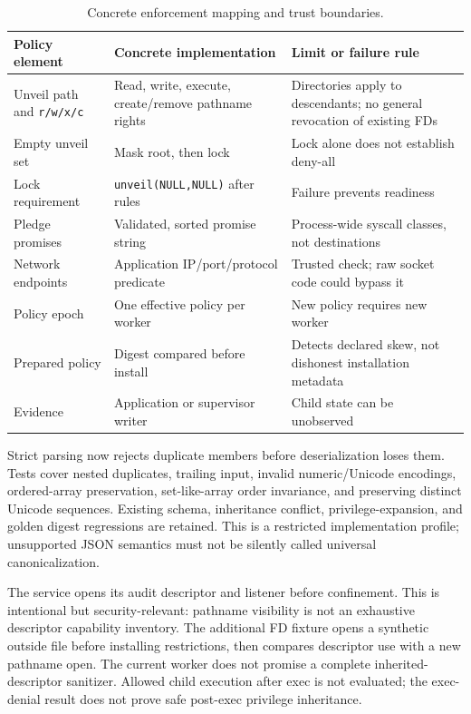 \documentclass[electronics,article,submit,pdftex,moreauthors]{Definitions/mdpi}
\begin{document}
\begin{table}[H]\caption{Concrete enforcement mapping and trust boundaries.}\label{tab:mapping}
\begin{tabularx}{\textwidth}{lYY}
\toprule Policy element & Concrete implementation & Limit or failure rule\\\midrule
Unveil path and \texttt{r/w/x/c} & Read, write, execute, create/remove pathname rights & Directories apply to descendants; no general revocation of existing FDs\\
Empty unveil set & Mask root, then lock & Lock alone does not establish deny-all\\
Lock requirement & \texttt{unveil(NULL,NULL)} after rules & Failure prevents readiness\\
Pledge promises & Validated, sorted promise string & Process-wide syscall classes, not destinations\\
Network endpoints & Application IP/port/protocol predicate & Trusted check; raw socket code could bypass it\\
Policy epoch & One effective policy per worker & New policy requires new worker\\
Prepared policy & Digest compared before install & Detects declared skew, not dishonest installation metadata\\
Evidence & Application or supervisor writer & Child state can be unobserved\\\bottomrule
\end{tabularx}\end{table}

Strict parsing now rejects duplicate members before deserialization loses them. Tests cover nested duplicates, trailing input, invalid numeric/Unicode encodings, ordered-array preservation, set-like-array order invariance, and preserving distinct Unicode sequences. Existing schema, inheritance conflict, privilege-expansion, and golden digest regressions are retained. This is a restricted implementation profile; unsupported JSON semantics must not be silently called universal canonicalization.

The service opens its audit descriptor and listener before confinement. This is intentional but security-relevant: pathname visibility is not an exhaustive descriptor capability inventory. The additional FD fixture opens a synthetic outside file before installing restrictions, then compares descriptor use with a new pathname open. The current worker does not promise a complete inherited-descriptor sanitizer. Allowed child execution after exec is not evaluated; the exec-denial result does not prove safe post-exec privilege inheritance.
\end{document}
